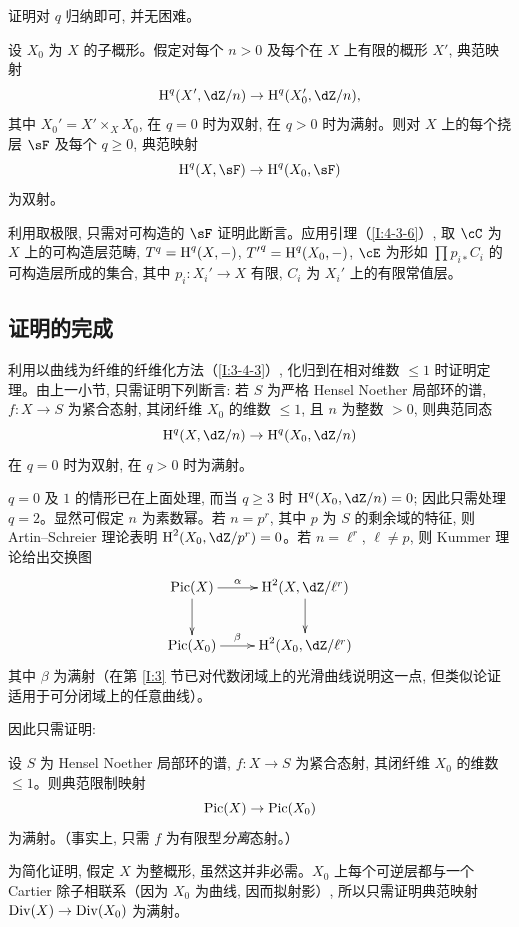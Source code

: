 证明对 $q$ 归纳即可, 并无困难。

\begin{proposition}\label{I:4-3-7}
设 $X_0$ 为 $X$ 的子概形。假定对每个 $n>0$ 及每个在 $X$ 上有限的概形 $X'$, 典范映射
\[
  \h^q(X',\dZ/n) \to \h^q(X_0',\dZ/n)\text{,}
\]
其中 $X_0'=X'\times_XX_0$, 在 $q=0$ 时为双射, 在 $q>0$ 时为满射。则对 $X$ 上的每个挠层 $\sF$ 及每个 $q\geqslant0$, 典范映射
\[
  \h^q(X,\sF) \to \h^q(X_0,\sF)
\]
为双射。
\end{proposition}

利用取极限, 只需对可构造的 $\sF$ 证明此断言。应用引理（\ref{I:4-3-6}）, 取 $\cC$ 为 $X$ 上的可构造层范畴, $T^q=\operatorname{H}^q(X,-)$, ${T'}^q=\operatorname{H}^q(X_0,-)$, $\cE$ 为形如 $\prod p_{i*}C_i$ 的可构造层所成的集合, 其中 $p_i:X_i'\to X$ 有限, $C_i$ 为 $X_i'$ 上的有限常值层。

\subsection{证明的完成}\label{I:4-4}

利用以曲线为纤维的纤维化方法（\ref{I:3-4-3}）, 化归到在相对维数 $\leqslant1$ 时证明定理。由上一小节, 只需证明下列断言: 若 $S$ 为严格 Hensel Noether 局部环的谱, $f:X\to S$ 为紧合态射, 其闭纤维 $X_0$ 的维数 $\leqslant1$, 且 $n$ 为整数 $>0$, 则典范同态
\[
  \h^q(X,\dZ/n) \to \h^q(X_0,\dZ/n)
\]
在 $q=0$ 时为双射, 在 $q>0$ 时为满射。

$q=0$ 及 $1$ 的情形已在上面处理, 而当 $q\geqslant3$ 时 $\h^q(X_0,\dZ/n)=0$; 因此只需处理 $q=2$。显然可假定 $n$ 为素数幂。若 $n=p^r$, 其中 $p$ 为 $S$ 的剩余域的特征, 则 Artin--Schreier 理论表明 $\h^2(X_0,\dZ/p^r)=0$。若 $n=\ell^r$, $\ell\ne p$, 则 Kummer 理论给出交换图
\[\xymatrix{
  \pic(X) \ar[d] \ar[r]^-\alpha
    & \h^2(X,\dZ/\ell^r) \ar[d] \\
  \pic(X_0) \ar[r]^-\beta
    & \h^2(X_0,\dZ/\ell^r)
}\]
其中 $\beta$ 为满射（在第 \ref{I:3} 节已对代数闭域上的光滑曲线说明这一点, 但类似论证适用于可分闭域上的任意曲线）。

因此只需证明:

\begin{proposition}\label{I:4-4-1}
设 $S$ 为 Hensel Noether 局部环的谱, $f:X\to S$ 为紧合态射, 其闭纤维 $X_0$ 的维数 $\leqslant1$。则典范限制映射
\[
  \operatorname{Pic}(X)\to \operatorname{Pic}(X_0)
\]
为满射。（事实上, 只需 $f$ 为有限型\emph{分离}态射。）
\end{proposition}

为简化证明, 假定 $X$ 为整概形, 虽然这并非必需。$X_0$ 上每个可逆层都与一个 Cartier 除子相联系（因为 $X_0$ 为曲线, 因而拟射影）, 所以只需证明典范映射 $\operatorname{Div}(X)\to\operatorname{Div}(X_0)$ 为满射。

